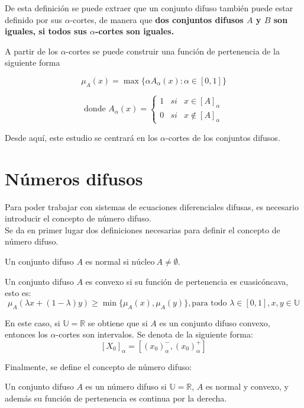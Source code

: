 De esta definición se puede extraer que un conjunto difuso también puede estar definido por sus $\alpha$-cortes, de manera que \textbf{dos conjuntos difusos $A$ y $B$ son iguales, si todos sus $\alpha$-cortes son iguales.} 

A partir de los $\alpha$-cortes se puede construir una función de pertenencia de la siguiente forma \cite{apuntesfuzzy}

\[
\mu_A(x) = \max{\{\alpha A_\alpha(x) : \alpha \in [0, 1]}\}
\]

\[
\text{donde }A_\alpha(x) = \left\{
\begin{array}{ccc}
  1 & si & x \in [A]_\alpha \\
  0 & si & x \notin [A]_\alpha
\end{array}
\right.
\]

Desde aquí, este estudio se centrará en los $\alpha$-cortes de los conjuntos difusos.

\section{Números difusos}
Para poder trabajar con sistemas de ecuaciones diferenciales difusas, es necesario introducir el concepto de número difuso. \\
Se da en primer lugar dos definiciones necesarias para definir el concepto de número difuso.

\begin{definicion}
  \label{def:difuso_normal}
  Un conjunto difuso $A$ es normal si $\text{núcleo} ~ A \neq \emptyset$.
\end{definicion}

\begin{definicion}
  \label{def:difuso_convexo}
  Un conjunto difuso $A$ es convexo si su función de pertenencia es cuasicóncava, esto es:
  \[
  \mu_A(\lambda x + (1-\lambda)y) \geq \min{\{\mu_A(x), \mu_A(y)\}}, \text{para todo } \lambda \in [0, 1], x, y \in \mathbb{U}
  \]
\end{definicion}

En este caso, si $\mathbb{U}=\mathbb{R}$ se obtiene que si $A$ es un conjunto difuso convexo, entonces los $\alpha$-cortes son intervalos. Se denota de la siguiente forma:
\[
  [X_0]_\alpha = [(x_0)_\alpha^- , (x_0)_\alpha^+]
  \]

  Finalmente, se define el concepto de número difuso:

  \begin{definicion}
    \label{def:numero_difuso}
    Un conjunto difuso $A$ es un número difuso si $\mathbb{U}=\mathbb{R}$, $A$ es normal y convexo, y además su función de pertenencia es continua por la derecha.
  \end{definicion}


